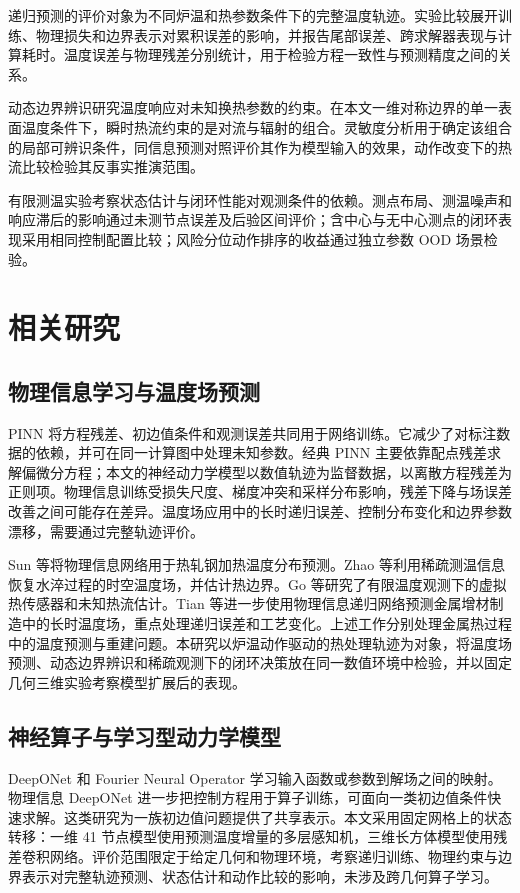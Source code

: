 递归预测的评价对象为不同炉温和热参数条件下的完整温度轨迹。实验比较展开训练、物理损失和边界表示对累积误差的影响，并报告尾部误差、跨求解器表现与计算耗时。温度误差与物理残差分别统计，用于检验方程一致性与预测精度之间的关系。

动态边界辨识研究温度响应对未知换热参数的约束。在本文一维对称边界的单一表面温度条件下，瞬时热流约束的是对流与辐射的组合。灵敏度分析用于确定该组合的局部可辨识条件，同信息预测对照评价其作为模型输入的效果，动作改变下的热流比较检验其反事实推演范围。

有限测温实验考察状态估计与闭环性能对观测条件的依赖。测点布局、测温噪声和响应滞后的影响通过未测节点误差及后验区间评价；含中心与无中心测点的闭环表现采用相同控制配置比较；风险分位动作排序的收益通过独立参数 OOD 场景检验。

\section{相关研究}

\subsection{物理信息学习与温度场预测}

PINN 将方程残差、初边值条件和观测误差共同用于网络训练\cite{raissi2019pinn}。它减少了对标注数据的依赖，并可在同一计算图中处理未知参数。经典 PINN 主要依靠配点残差求解偏微分方程；本文的神经动力学模型以数值轨迹为监督数据，以离散方程残差为正则项。物理信息训练受损失尺度、梯度冲突和采样分布影响\cite{wang2021gradient,krishnapriyan2021failure}，残差下降与场误差改善之间可能存在差异。温度场应用中的长时递归误差、控制分布变化和边界参数漂移，需要通过完整轨迹评价。

Sun 等将物理信息网络用于热轧钢加热温度分布预测\cite{sun2025steel}。Zhao 等利用稀疏测温信息恢复水淬过程的时空温度场，并估计热边界\cite{zhao2022quenching}。Go 等研究了有限温度观测下的虚拟热传感器和未知热流估计\cite{go2023sensor}。Tian 等进一步使用物理信息递归网络预测金属增材制造中的长时温度场，重点处理递归误差和工艺变化\cite{tian2025longhorizon}。上述工作分别处理金属热过程中的温度预测与重建问题。本研究以炉温动作驱动的热处理轨迹为对象，将温度场预测、动态边界辨识和稀疏观测下的闭环决策放在同一数值环境中检验，并以固定几何三维实验考察模型扩展后的表现。

\subsection{神经算子与学习型动力学模型}

DeepONet 和 Fourier Neural Operator 学习输入函数或参数到解场之间的映射\cite{lu2021deeponet,li2021fno}。物理信息 DeepONet 进一步把控制方程用于算子训练，可面向一类初边值条件快速求解\cite{wang2021pideeponet}。这类研究为一族初边值问题提供了共享表示。本文采用固定网格上的状态转移：一维 41 节点模型使用预测温度增量的多层感知机，三维长方体模型使用残差卷积网络。评价范围限定于给定几何和物理环境，考察递归训练、物理约束与边界表示对完整轨迹预测、状态估计和动作比较的影响，未涉及跨几何算子学习。

